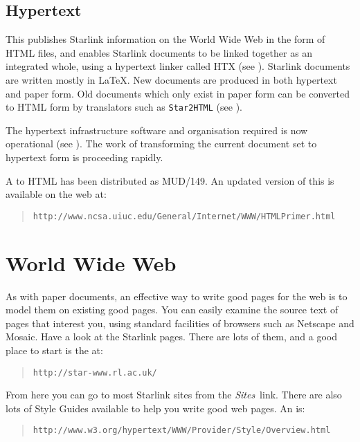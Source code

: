 \subsection{Hypertext}

This publishes Starlink information on the World Wide Web in the
form of HTML files, and enables Starlink documents to be linked together
as an integrated whole, using a hypertext linker called HTX
(see ).
Starlink documents are written mostly in \LaTeX.
New documents are produced in both hypertext and paper form.
Old documents which only exist in paper form can be converted to HTML form by
translators such as {\tt Star2HTML}
(see ).

The hypertext infrastructure software and organisation required is now
operational
(see ).
The work of transforming the current document set to hypertext form is
proceeding rapidly.

A 
to HTML has been distributed as MUD/149.
An updated version of this is available on the web at:
\begin{quote}
{\tt http://www.ncsa.uiuc.edu/General/Internet/WWW/HTMLPrimer.html}
\end{quote}

\section{World Wide Web}

As with paper documents, an effective way to write good pages for the web
is to model them on existing good pages.
You can easily examine the source text of pages that interest you, using
standard facilities of browsers such as Netscape and Mosaic.
Have a look at the Starlink pages.
There are lots of them, and a good place to start is the
 at:
\begin{quote}
{\tt http://star-www.rl.ac.uk/}
\end{quote}
From here you can go to most Starlink sites from the {\em Sites}\, link.
There are also lots of Style Guides available to help you write good web pages.
An  is:
\begin{quote}
{\tt http://www.w3.org/hypertext/WWW/Provider/Style/Overview.html}
\end{quote}

